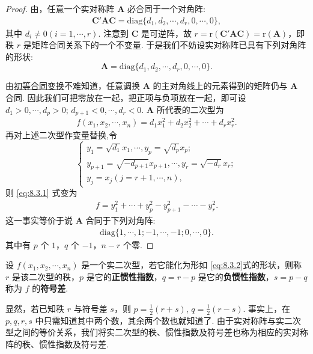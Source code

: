 \documentclass[../../main.tex]{subfiles}
\begin{document}
\begin{proof}
由，任意一个实对称阵 $\boldsymbol{A}$ 必合同于一个对角阵:
\begin{align*}
\boldsymbol{C}'\boldsymbol{A}\boldsymbol{C}=\mathrm{diag}\{d_1,d_2,\cdots,d_r,0,\cdots,0\},
\end{align*}
其中 $d_i\neq 0 (i = 1,\cdots,r)$. 注意到 $\boldsymbol{C}$ 是可逆阵，故 $r = \mathrm{r}(\boldsymbol{C}'\boldsymbol{A}\boldsymbol{C})=\mathrm{r}(\boldsymbol{A})$，即秩 $r$ 是矩阵合同关系下的一个不变量. 于是我们不妨设实对称阵已具有下列对角阵的形状:
\[
\boldsymbol{A}=\mathrm{diag}\{d_1,d_2,\cdots,d_r,0,\cdots,0\}.
\]

由\hyperref[lemma:初等合同变换]{初等合同变换}不难知道，任意调换 $\boldsymbol{A}$ 的主对角线上的元素得到的矩阵仍与 $\boldsymbol{A}$ 合同. 因此我们可把零放在一起，把正项与负项放在一起，即可设 $d_1>0,\cdots,d_p>0$; $d_{p + 1}<0,\cdots,d_r<0$. $\boldsymbol{A}$ 所代表的二次型为
\begin{align}
f(x_1,x_2,\cdots,x_n)=d_1x_1^2 + d_2x_2^2 + \cdots + d_rx_r^2.\label{eq:8.3.1}
\end{align}
再对上述二次型作变量替换,令
\[
\begin{cases}
y_1 = \sqrt{d_1}x_1,\cdots,y_p = \sqrt{d_p}x_p;\\
y_{p + 1} = \sqrt{-d_{p + 1}}x_{p + 1},\cdots,y_r = \sqrt{-d_r}x_r;\\
y_j = x_j (j = r + 1,\cdots,n),
\end{cases}
\]
则 \eqref{eq:8.3.1} 式变为
\begin{align*}
f = y_1^2 + \cdots + y_p^2 - y_{p + 1}^2 - \cdots - y_r^2.
\end{align*}
这一事实等价于说 $\boldsymbol{A}$ 合同于下列对角阵:
\begin{align*}
\mathrm{diag}\{1,\cdots,1;-1,\cdots,-1;0,\cdots,0\}.
\end{align*}
其中有 $p$ 个 $1$，$q$ 个 $-1$，$n - r$ 个零. 
\end{proof}

\begin{definition}
设 $f(x_1,x_2,\cdots,x_n)$ 是一个实二次型，若它能化为形如 \eqref{eq:8.3.2}式的形状，则称 $r$ 是该二次型的秩，$p$ 是它的\textbf{正惯性指数}，$q = r - p$ 是它的\textbf{负惯性指数}，$s = p - q$ 称为 $f$ 的\textbf{符号差}.
\end{definition}
\begin{remark}
显然，若已知秩 $r$ 与符号差 $s$，则 $p = \frac{1}{2}(r + s)$, $q = \frac{1}{2}(r - s)$. 事实上，在 $p,q,r,s$ 中只需知道其中两个数，其余两个数也就知道了. 由于实对称阵与实二次型之间的等价关系，我们将实二次型的秩、惯性指数及符号差也称为相应的实对称阵的秩、惯性指数及符号差.
\end{remark}
\end{document}
